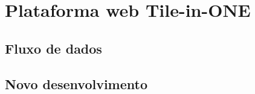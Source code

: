 \chapter{Plataforma web Tile-in-ONE}
    \section{Fluxo de dados}
    \section{Novo desenvolvimento}